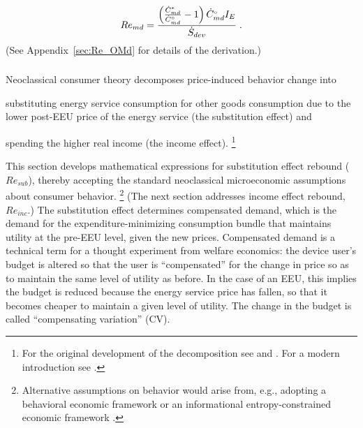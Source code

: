 \documentclass[12pt]{article}\usepackage[]{graphicx}\usepackage[]{xcolor}
\begin{document}
\begin{equation} \label{eq:Re_md}
  Re_{md} = \frac{\left( \frac{{\dot{C}}^*_{md}}{{}{\dot{C}}^{\scriptscriptstyle \circ}_{md}} - 1 \right) {}{\dot{C}}^{\scriptscriptstyle \circ}_{md} I_E}{\dot{S}_{dev}}{} \; .
\end{equation}
%
(See Appendix~\ref{sec:Re_OMd} for details of the derivation.)


\subsubsection{\Subeffect}
\label{sec:sub_effect_main_paper}

Neoclassical consumer theory decomposes price-induced
behavior change into
%
\begin{enumerate*}[label={(\roman*)}]
	
  \item substituting energy service consumption for
        other goods consumption due to the lower post-EEU price of the energy service 
        (the substitution effect) and
  
  \item spending the higher real income (the income effect).%
        \footnote{
          For the original development of the decomposition
          see \citet{Slutsky1915} and \citet{Allen1936}.
          For a modern introduction see \citet{Nicholson2017}.
        }
    
\end{enumerate*}
%
This section develops mathematical expressions 
for substitution effect rebound ($Re_{sub}$),
thereby accepting the standard neoclassical microeconomic assumptions
about consumer behavior.%
\footnote{
  Alternative assumptions on behavior would arise from,
  e.g., adopting a behavioral economic framework
  \citep{Dutschke:2018aa, Dorner:2019aa} or
  an informational entropy-constrained economic framework \citep{Foley:2020aa}.
}
%
(The next section addresses income effect rebound, $Re_{inc}$.)
The substitution effect determines compensated demand,
which is the demand for
the expenditure-minimizing consumption bundle that
maintains utility at the pre-EEU level, given the new prices.
Compensated demand is a technical term for a thought experiment from welfare economics: 
the device user's budget is altered so that the user is ``compensated''
for the change in price so as to maintain the same level of utility as before.
In the case of an EEU, this implies the budget is reduced
because the energy service price has fallen, so that it becomes
cheaper to maintain a given level of utility.
The change in the budget is called ``compensating variation'' (CV).
\end{document}
